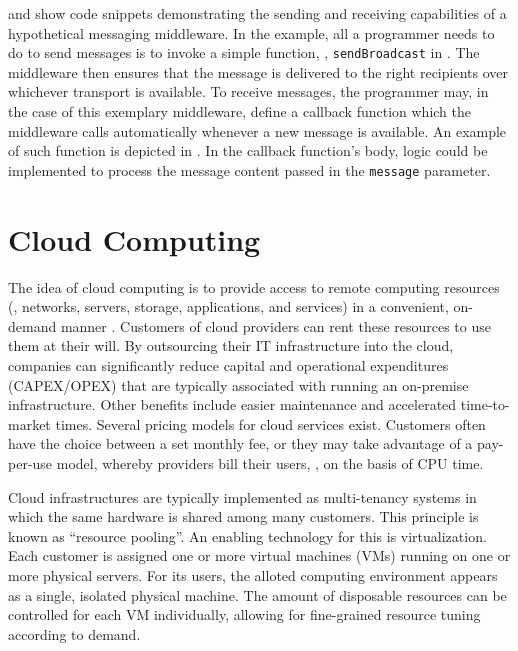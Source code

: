  and  show code snippets demonstrating the sending and receiving capabilities of a hypothetical messaging middleware. In the example, all a programmer needs to do to send messages is to invoke a simple function, \eg , \texttt{sendBroadcast} in . The middleware then ensures that the message is delivered to the right recipients over whichever transport is available. To receive messages, the programmer may, in the case of this exemplary middleware, define a callback function which the middleware calls automatically whenever a new message is available. An example of such function is depicted in . In the callback function's body, logic could be implemented to process the message content passed in the \texttt{message} parameter.

%
%
%
%
%
%
%
%
%
%

\section{Cloud Computing}

The idea of cloud computing is to provide access to remote computing resources  (\eg , networks, servers, storage, applications, and services) in a convenient, on-demand manner \cite{mell2011nist}. Customers of cloud providers can rent these resources to use them at their will. By outsourcing their IT infrastructure into the cloud, companies can significantly reduce capital and operational expenditures (CAPEX/OPEX) that are typically associated with running an on-premise infrastructure. Other benefits include easier maintenance and accelerated time-to-market times. Several pricing models for cloud services exist. Customers often have the choice between a set monthly fee, or they may take advantage of a pay-per-use model, whereby providers bill their users, \eg , on the basis of CPU time.

Cloud infrastructures are typically implemented as multi-tenancy systems in which the same hardware is shared among many customers. This principle is known as ``resource pooling''. An enabling technology for this is virtualization. Each customer is assigned one or more virtual machines (VMs) running on one or more physical servers. For its users, the alloted computing environment appears as a single, isolated physical machine. The amount of disposable resources can be controlled for each VM individually, allowing for fine-grained resource tuning according to demand.

